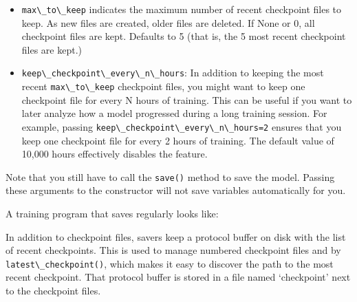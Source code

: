 \begin{itemize}
\item
  \lstinline{max\_to\_keep} indicates the maximum number of recent
  checkpoint files to keep. As new files are created, older files are
  deleted. If None or 0, all checkpoint files are kept. Defaults to 5
  (that is, the 5 most recent checkpoint files are kept.)
\item
  \lstinline{keep\_checkpoint\_every\_n\_hours}: In addition to keeping the
  most recent \lstinline{max\_to\_keep} checkpoint files, you might want to
  keep one checkpoint file for every N hours of training. This can be
  useful if you want to later analyze how a model progressed during a
  long training session. For example, passing
  \lstinline{keep\_checkpoint\_every\_n\_hours=2} ensures that you keep one
  checkpoint file for every 2 hours of training. The default value of
  10,000 hours effectively disables the feature.
\end{itemize}

Note that you still have to call the \lstinline{save()} method to save the
model. Passing these arguments to the constructor will not save
variables automatically for you.

A training program that saves regularly looks like:

\begin{Shaded}
\end{Shaded}

In addition to checkpoint files, savers keep a protocol buffer on disk
with the list of recent checkpoints. This is used to manage numbered
checkpoint files and by \lstinline{latest\_checkpoint()}, which makes it
easy to discover the path to the most recent checkpoint. That protocol
buffer is stored in a file named `checkpoint' next to the checkpoint
files.

